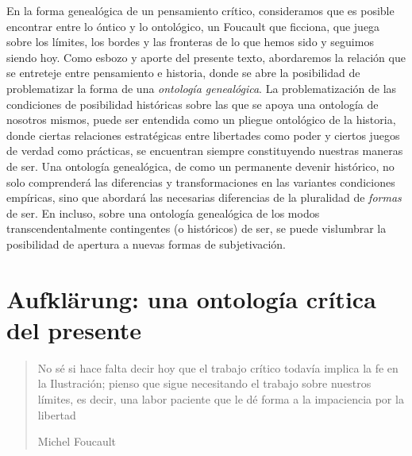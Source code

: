 En la forma genealógica de un pensamiento crítico, consideramos que es
posible encontrar entre lo óntico y lo ontológico, un Foucault que
ficciona, que juega sobre los límites, los bordes y las fronteras de lo
que hemos sido y seguimos siendo hoy. Como esbozo y aporte del presente
texto, abordaremos la relación que se entreteje entre pensamiento e
historia, donde se abre la posibilidad de problematizar la forma de una
\emph{ontología genealógica}. La problematización de las condiciones de
posibilidad históricas sobre las que se apoya una ontología de nosotros
mismos, puede ser entendida como un pliegue ontológico de la historia,
donde ciertas relaciones estratégicas entre libertades como poder y
ciertos juegos de verdad como prácticas, se encuentran siempre
constituyendo nuestras maneras de ser. Una ontología genealógica, de
como un permanente devenir histórico, no solo comprenderá las
diferencias y transformaciones en las variantes condiciones empíricas,
sino que abordará las necesarias diferencias de la pluralidad de
\emph{formas} de ser. En incluso, sobre una ontología genealógica de los
modos transcendentalmente contingentes (o históricos) de ser, se puede
vislumbrar la posibilidad de apertura a nuevas formas de subjetivación.

\section{Aufklärung: una ontología crítica del presente}

\begin{quote}
No sé si hace falta decir hoy que el trabajo crítico todavía implica la
fe en la Ilustración; pienso que sigue necesitando el trabajo sobre
nuestros límites, es decir, una labor paciente que le dé forma a la
impaciencia por la libertad

Michel Foucault
\end{quote}

